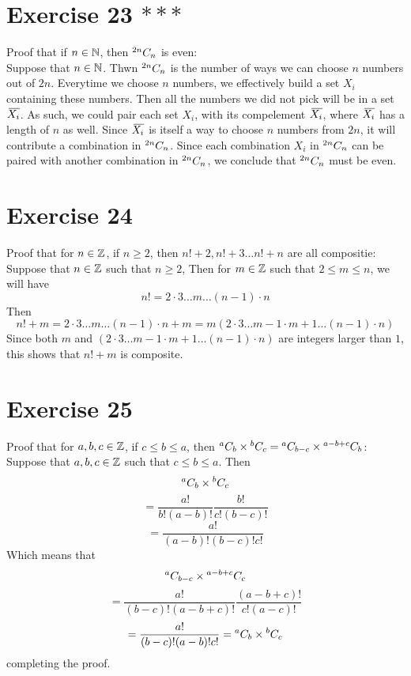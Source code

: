 \documentclass[12pt]{article}
\begin{document}
    \section*{Exercise 23 $***$}
    Proof that if $n \in \mathbb{N}$,
    then ${}^{2n}C_{n}$ is even: \\
    Suppose that $n \in \mathbb{N}$.
    Thwn ${}^{2n}C_{n}$ is the number of ways we can choose $n$
    numbers out of $2n$.
    Everytime we choose $n$ numbers,
    we effectively build a set $X_i$ containing these numbers.
    Then all the numbers we did not pick will be in a set $\,\overline{\!{X_i}}$.
    As such, we could pair each set $X_i$,
    with its compelement $\,\overline{\!{X_i}}$,
    where $\,\overline{\!{X_i}}$ has a length of $n$ as well.
    Since $\,\overline{\!{X_i}}$ is itself
    a way to choose $n$ numbers from $2n$,
    it will contribute a combination in ${}^{2n}C_{n}$.
    Since each combination $X_i$ in ${}^{2n}C_{n}$ can be paired
    with another combination in ${}^{2n}C_{n}$,
    we conclude that ${}^{2n}C_{n}$ must be even. \\

    \section*{Exercise 24}
    Proof that for $n \in \mathbb{Z}$,
    if $n \geqslant 2$,
    then $n! + 2, n! + 3 \dots n! + n$ are all compositie: \\
    Suppose that $n \in \mathbb{Z}$
    such that $n \geqslant 2$,
    Then for $m \in \mathbb{Z}$ 
    such that $2 \leqslant m \leqslant n$,
    we will have
    \[ n! = 2 \cdot 3 \dots m  \dots (n-1) \cdot n \]
    Then
    \[ n! + m = 2 \cdot 3 \dots m  \dots (n-1) \cdot n + m
    =  m (2 \cdot 3 \dots m - 1 \cdot m + 1  \dots (n-1) \cdot n) \]
    Since both $m$
    and $(2 \cdot 3 \dots m - 1 \cdot m + 1  \dots (n-1) \cdot n)$
    are integers larger than $1$,
    this shows that $n! + m$ is composite. \\

    \section*{Exercise 25}
    Proof that for $a, b, c \in \mathbb{Z}$,
    if $c \leqslant b \leqslant a$,
    then ${}^{a}C_{b} \times {}^{b}C_{c}
    = {}^{a}C_{b-c} \times {}^{a-b+c}C_{b}$: \\
    Suppose that $a, b, c \in \mathbb{Z}$
    such that $c \leqslant b \leqslant a$.
    Then
    \[ {}^{a}C_{b} \times {}^{b}C_{c} \]
    \[ = \dfrac{a!}{b!(a-b)!}\dfrac{b!}{c!(b-c)!} \]
    \[ = \dfrac{a!}{(a-b)!(b-c)!c!} \]
    Which means that
    \[ {}^{a}C_{b-c} \times {}^{a-b+c}C_{c} \]
    \[ = \dfrac{a!}{(b-c)!(a-b+c)!}\dfrac{(a-b+c)!}{c!(a-c)!} \]
    \[ = \dfrac{a!}{(b-c)!(a-b)!c!} = {}^{a}C_{b} \times {}^{b}C_{c} \]
    completing the proof. \\
\end{document}

